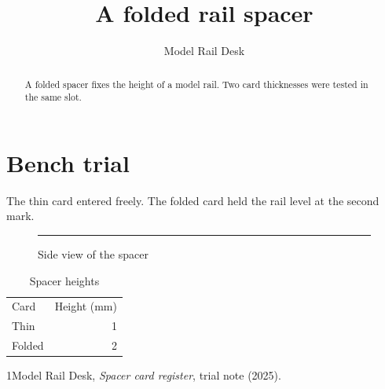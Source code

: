 \documentclass{llncs}
\begin{document}
\title{A folded rail spacer}\author{Model Rail Desk}\maketitle\begin{abstract}A folded spacer fixes the height of a model rail. Two card thicknesses were tested in the same slot.\end{abstract}
\section{Bench trial}
The thin card entered freely. The folded card held the rail level at the second mark.
\begin{figure}[ht]\centering\rule{28mm}{2mm}\caption{Side view of the spacer}\end{figure}
\begin{table}[ht]\centering\begin{tabular}{lr}Card&Height (mm)\\Thin&1\\Folded&2\end{tabular}\caption{Spacer heights}\end{table}
\begin{thebibliography}{1}Model Rail Desk, \emph{Spacer card register}, trial note (2025).\end{thebibliography}
\end{document}

